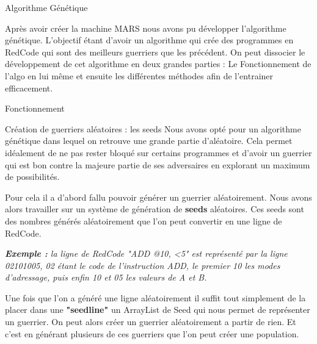 \documentclass[a4paper, 10pt]{article}
\begin{document}
    \begin{section}{Algorithme Génétique}\label{sec:algoGenetique}
        \par
            Après avoir créer la machine MARS nous avons pu développer l'algorithme génétique. L'objectif étant d'avoir un algorithme qui crée des programmes en RedCode qui sont des meilleurs guerriers que les précédent. On peut dissocier le développement de cet algorithme en deux grandes parties : Le Fonctionnement de l'algo en lui même et ensuite les différentes méthodes afin de l'entrainer efficacement.
            \medskip

        \begin{subsection}{Fonctionnement}\label{sec:fonctionnement}

            \begin{subsubsection}{Création de guerriers aléatoires : les seeds}\label{sec:seeds}
                \sloppypar
                    Nous avons opté pour un algorithme génétique dans lequel on retrouve une grande partie d'aléatoire. Cela permet idéalement de ne pas rester bloqué sur certains programmes et d'avoir un guerrier qui est bon contre la majeure partie de ses adversaires en explorant un maximum de possibilités.
                    \smallskip
                \par
                    Pour cela il a d'abord fallu pouvoir générer un guerrier aléatoirement. Nous avons alors travailler sur un système de génération de \textbf{seeds} aléatoires. Ces seeds sont des nombres générés aléatoirement que l'on peut convertir en une ligne de RedCode. 
                    \medskip
                \par
                    \textit{\textbf{Exemple :} la ligne de RedCode "ADD @10, <5" est représenté par la ligne 02101005, 02 étant le code de l'instruction ADD, le premier 10 les modes d'adressage, puis enfin 10 et 05 les valeurs de A et B.}
                    \bigskip
                \par
                    Une fois que l'on a généré une ligne aléatoirement il suffit tout simplement de la placer dans une \textbf{"seedline"} un ArrayList de Seed qui nous permet de représenter un guerrier. On peut alors créer un guerrier aléatoirement a partir de rien. Et c'est en générant plusieurs de ces guerriers que l'on peut créer une population.
                    \bigskip
            \end{subsubsection}


\end{subsection}
\end{section}
\end{document}
